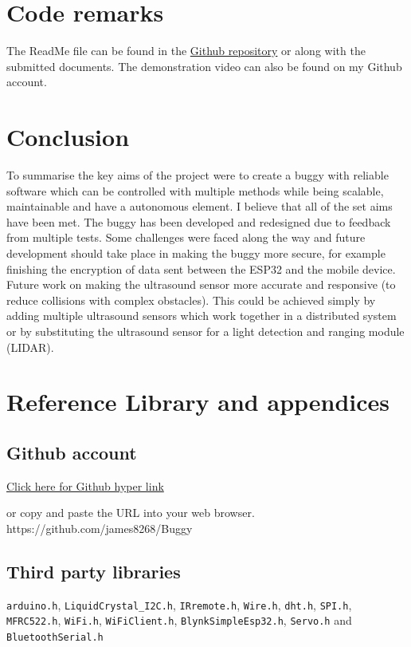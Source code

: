 \documentclass[8pt, a4paper]{article}
\begin{document}
	

\section{Code remarks}

The ReadMe file can be found in the \href{https://github.com/james8268/Buggy}{Github repository} or along with the submitted documents. 
The demonstration video can also be found on my Github account. 


\section{Conclusion}
To summarise the key aims of the project were to create a buggy with reliable software which can be controlled with multiple methods while being scalable, maintainable and have a autonomous element. I believe that all of the set aims have been met. The buggy has been developed and redesigned due to feedback from multiple tests. Some challenges were faced along the way and future development should take place in making the buggy more secure, for example finishing the encryption of data sent between the ESP32 and the mobile device. Future work on making the ultrasound sensor more accurate and responsive (to reduce collisions with complex obstacles). This could be achieved simply by adding multiple ultrasound sensors which work together in a distributed system or by substituting the ultrasound sensor for a light detection and ranging module (LIDAR). 


\newpage
\section{Reference Library and appendices}
\subsection{Github account}

\href{https://github.com/james8268/Buggy}{Click here for Github hyper link} 

or copy and paste the URL into your web browser. https://github.com/james8268/Buggy

\listoffigures

\subsection{Third party libraries}

\verb|arduino.h|, \verb|LiquidCrystal_I2C.h|, \verb|IRremote.h|, \verb|Wire.h|, \verb|dht.h|, \verb|SPI.h|, \verb|MFRC522.h|, \verb|WiFi.h|, \verb|WiFiClient.h|, \verb|BlynkSimpleEsp32.h|, \verb|Servo.h| and \verb|BluetoothSerial.h|
\end{document}

